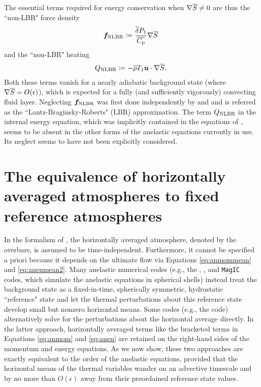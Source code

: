 \documentclass[12pt]{article}
\begin{document}
The essential terms required for energy conservation when $\nabla\overline{S}\neq0$ are thus the ``non-LBR" force density
\begin{align}\label{eq:nlbrmom}
	\bm{f}_{\rm NLBR} \coloneqq \frac{\overline{\delta} P_1}{\overline{C_{\rm{p}}}} \nabla\overline{S}
\end{align}
and the ``non-LBR" heating
\begin{align}\label{eq:nlbrheat}
	Q_{\rm NLBR} \coloneqq -\overline{\rho} T_1\bm{u}\cdot\nabla\overline{S}.
\end{align}
Both these terms vanish for a nearly adiabatic background state (where $\nabla\overline{S}=O(\epsilon)$), which is expected for a fully (and sufficiently vigorously) convecting fluid layer.  Neglecting $\bm{f}_{\rm NLBR}$ was first done independently by \citet{Lantz1992} and \citet{Braginsky1995} and is referred as the ``Lantz-Braginsky-Roberts" (LBR) approximation. The term $Q_{\rm NLBR}$ in the internal energy equation, which was implicitly contained in the equations of \citet{Gough1969}, seems to be absent in the other forms of the anelastic equations currently in use. Its neglect seems to have not been explicitly considered. 

\section{The equivalence of horizontally averaged atmospheres to fixed reference atmospheres}\label{sec:meantoref}
In the formalism of \citet{Gough1969}, the horizontally averaged atmosphere, denoted by the overbars, is assumed to be time-independent. Furthermore, it cannot be specified a priori because it depends on the ultimate flow via Equations \eqref{eq:anmommean} and \eqref{eq:anenmean2}. Many anelastic numerical codes (e.g., the {\rayleigh}, {\eulag}, and \texttt{MagIC} codes, which simulate the anelastic equations in spherical shells) instead treat the background state as a fixed-in-time, spherically symmetric, hydrostatic ``reference" state and let the thermal perturbations about this reference state develop small but nonzero horizontal means. Some codes (e.g., the {\ash} code) alternatively solve for the perturbations about the horizontal average directly. In the latter approach, horizontally averaged terms like the bracketed terms in Equations \eqref{eq:anmom} and \eqref{eq:anen} are retained on the right-hand sides of the momentum and energy equations. As we now show, these two approaches are exactly equivalent to the order of the anelastic equations, provided that the horizontal means of the thermal variables wander on an advective timescale and by no more than $O(\epsilon)$ away from their preordained reference state values. 
\end{document}
